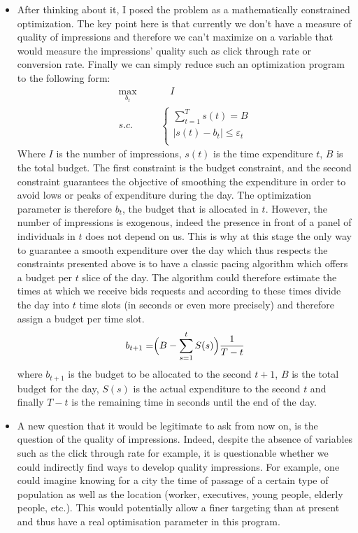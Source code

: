 \documentclass[12pt]{article}
\begin{document}
\begin{itemize}
\item After thinking about it, I posed the problem as a mathematically constrained optimization. The key point here is that currently we don't have a measure of quality of impressions and therefore we can't maximize on a variable that would measure the impressions' quality such as click through rate or conversion rate. Finally we can simply reduce such an optimization program to the following form:
\begin{align*}
\max_{b_t} &\quad I \\
s.c.  \qquad & 
\left\{
	\begin{array}{ll} 
		\displaystyle \sum_{t=1}^{T} s(t) = B\\
		|s(t) - b_t | \leq \varepsilon_t\\
	\end{array}
\right.
\end{align*}
Where $I$ is the number of impressions, $s(t)$ is the time expenditure $t$, $B$ is the total budget. The first constraint is the budget constraint, and the second constraint guarantees the objective of smoothing the expenditure in order to avoid lows or peaks of expenditure during the day. The optimization parameter is therefore $b_t$, the budget that is allocated in $t$. However, the number of impressions is exogenous, indeed the presence in front of a panel of individuals in $t$ does not depend on us. This is why at this stage the only way to guarantee a smooth expenditure over the day which thus respects the constraints presented above is to have a classic pacing algorithm which offers a budget per $t$ slice of the day. The algorithm could therefore estimate the times at which we receive bids requests and according to these times divide the day into $t$ time slots (in seconds or even more precisely) and therefore assign a budget per time slot. 
$$b_{t+1} = \Bigr(B - \displaystyle \sum_{s=1}^{t} S(s)\Bigl) \dfrac{1}{T-t}$$
where $b_{t+1}$ is the budget to be allocated to the second $t+1$, $B$ is the total budget for the day, $S(s)$ is the actual expenditure to the second $t$ and finally $T-t$ is the remaining time in seconds until the end of the day.  
\item A new question that it would be legitimate to ask from now on, is the question of the quality of impressions. Indeed, despite the absence of variables such as the click through rate for example, it is questionable whether we could indirectly find ways to develop quality impressions. For example, one could imagine knowing for a city the time of passage of a certain type of population as well as the location (worker, executives, young people, elderly people, etc.). This would potentially allow a finer targeting than at present and thus have a real optimisation parameter in this program.
\end{itemize}
\end{document}
